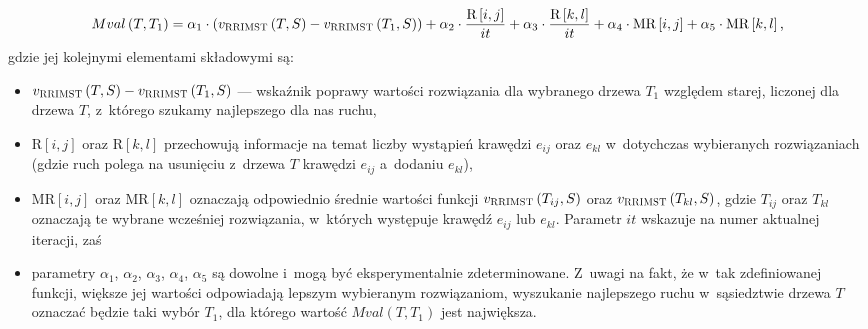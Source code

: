 \begin{equation}\label{eq:moveValue}
	Mval \left( T, T_{1} \right) = \alpha_{1} \cdot \left( v_{\textsc{RRIMST}} \left( T, S \right) - v_{\textsc{RRIMST}} \left( T_{1}, S \right) \right) + \alpha_{2} \cdot \frac{\text{R} \left[ i, j \right]}{it} + \alpha_{3} \cdot \frac{\text{R} \left[ k, l \right]}{it} + \alpha_{4} \cdot \text{MR} \left[ i, j \right] + \alpha_{5} \cdot \text{MR} \left[ k, l \right]\text{,}
\end{equation}
gdzie jej kolejnymi elementami składowymi są:
\begin{itemize}
	\item $v_{\textsc{RRIMST}} \left( T, S \right) - v_{\textsc{RRIMST}} \left( T_{1}, S \right)$ --- wskaźnik poprawy wartości rozwiązania dla wybranego drzewa $T_{1}$ względem starej, liczonej dla drzewa $T$, z~którego szukamy najlepszego dla nas ruchu,
	\item $\text{R} \left[ i, j \right]$ oraz $\text{R} \left[ k, l \right]$ przechowują informacje na temat liczby wystąpień krawędzi $e_{ij}$ oraz $e_{kl}$ w~dotychczas wybieranych rozwiązaniach (gdzie ruch polega na usunięciu z~drzewa $T$ krawędzi $e_{ij}$ a~dodaniu $e_{kl}$),
	\item $\text{MR} \left[ i, j \right]$ oraz $\text{MR} \left[ k, l \right]$ oznaczają odpowiednio średnie wartości funkcji $v_{\textsc{RRIMST}} \left( T_{ij}, S \right)$ oraz $v_{\textsc{RRIMST}} \left( T_{kl}, S \right)$, gdzie $T_{ij}$ oraz $T_{kl}$ oznaczają te wybrane wcześniej rozwiązania, w~których występuje krawędź $e_{ij}$ lub $e_{kl}$. Parametr $it$ wskazuje na numer aktualnej iteracji, zaś
	\item parametry $\alpha_{1}$, $\alpha_{2}$, $\alpha_{3}$, $\alpha_{4}$, $\alpha_{5}$ są dowolne i~mogą być eksperymentalnie zdeterminowane. Z~uwagi na fakt, że w~tak zdefiniowanej funkcji, większe jej wartości odpowiadają lepszym wybieranym rozwiązaniom, wyszukanie najlepszego ruchu w~sąsiedztwie drzewa $T$ oznaczać będzie taki wybór $T_{1}$, dla którego wartość $Mval  \left( T, T_{1} \right)$ jest największa.
\end{itemize}

